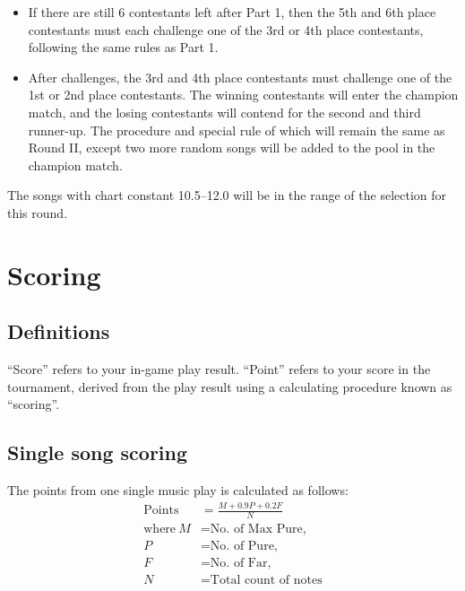 \documentclass{article}
\newcommand{\alert}[1]{{\color{red} #1}}
\newcommand{\srbgcolor}{red!40}
\begin{document}
\begin{itemize}
	\item If there are still 6 contestants left after Part 1,
	      then the 5th and 6th place contestants must each challenge
	      one of the 3rd or 4th place contestants,
	      following the same rules as Part 1.

	\item After challenges, the 3rd and 4th place contestants
	      must challenge one of the 1st or 2nd place contestants.
	      The winning contestants will enter the champion match,
	      and the losing contestants will contend for the
	      second and third runner-up.
	      The procedure and \colorbox{\srbgcolor}{special rule} of which
	      will remain the same as Round II,
	      except two more random songs will be added
	      to the pool in the champion match.
\end{itemize}

\alert{
	The songs with chart constant 10.5--12.0
	will be in the range of the selection for this round.
}

\section{Scoring}

\subsection{Definitions}
``Score'' refers to your in-game play result.
``Point'' refers to your score in the tournament,  %
derived from the play result
using a calculating procedure known as ``scoring''.

\newcommand{\Points}{\text{Points}}

\subsection{Single song scoring}
The points from one single music play is calculated as follows:
\alert{
	\begin{align*}
		\Points        & = \frac{M + 0.9P + 0.2F}{N}   \\
		\text{where}~M & = \text{No.~of Max Pure,}     \\
		P              & = \text{No.~of Pure,}         \\
		F              & = \text{No.~of Far,}          \\
		N              & = \text{Total count of notes}
	\end{align*}
}
\end{document}
